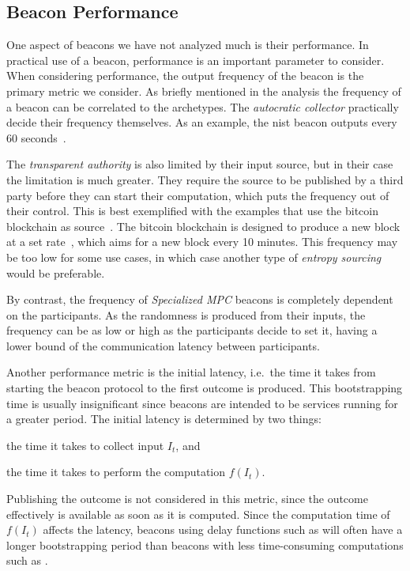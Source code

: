\subsection{Beacon Performance}
One aspect of beacons we have not analyzed much is their performance.
In practical use of a beacon, performance is an important parameter to consider.
When considering performance, the output frequency of the beacon is the primary metric we consider.
As briefly mentioned in the analysis the frequency of a beacon can be correlated to the archetypes.
The \emph{autocratic collector} practically decide their frequency themselves.
As an example, the \gls{nist} beacon outputs every 60 seconds~\cite{nistbeacon}.

The \emph{transparent authority} is also limited by their input source, but in their case the limitation is much greater.
They require the source to be published by a third party before they can start their computation, which puts the frequency out of their control.
This is best exemplified with the examples that use the bitcoin blockchain as source~\cite{bonneau2015bitcoin, bentov2016bitcoin, bunz2017proofsof}.
The bitcoin blockchain is designed to produce a new block at a set rate~\cite{nakamoto2008bitcoin}, which aims for a new block every 10 minutes.
This frequency may be too low for some use cases, in which case another type of \emph{entropy sourcing} would be preferable.

By contrast, the frequency of \emph{Specialized MPC} beacons is completely dependent on the participants.
As the randomness is produced from their inputs, the frequency can be as low or high as the participants decide to set it, having a lower bound of the communication latency between participants.

Another performance metric is the initial latency, i.e.\ the time it takes from starting the beacon protocol to the first outcome is produced.
This bootstrapping time is usually insignificant since beacons are intended to be services running for a greater period.
The initial latency is determined by two things:
\begin{eromanate*}
    \item the time it takes to collect input $I_t$, and
    \item the time it takes to perform the computation $f(I_t)$.
\end{eromanate*}
Publishing the outcome is not considered in this metric, since the outcome effectively is available as soon as it is computed.
Since the computation time of $f(I_t)$ affects the latency, beacons using delay functions such as  will often have a longer bootstrapping period than beacons with less time-consuming computations such as .
